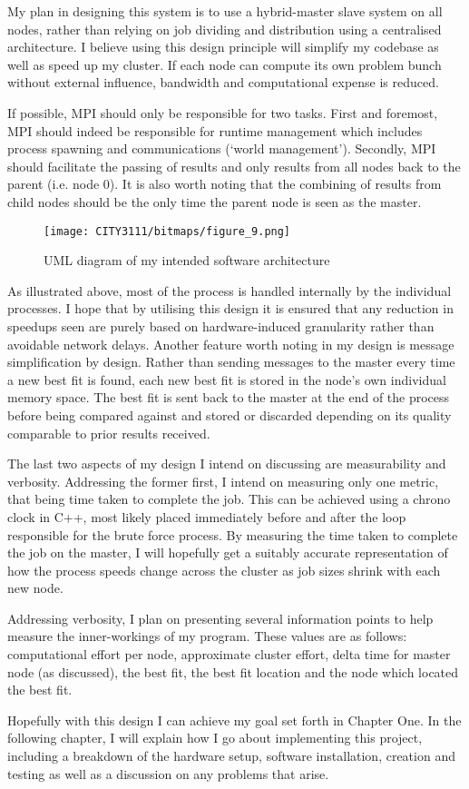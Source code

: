 My plan in designing this system is to use a hybrid-master slave system on all nodes, rather than relying on job dividing and distribution using a centralised architecture. I believe using this design principle will simplify my codebase as well as speed up my cluster. If each node can compute its own problem bunch without external influence, bandwidth and computational expense is reduced.

If possible, MPI should only be responsible for two tasks. First and foremost, MPI should indeed be responsible for runtime management which includes process spawning and communications (`world management'). Secondly, MPI should facilitate the passing of results and only results from all nodes back to the parent (i.e. node 0). It is also worth noting that the combining of results from child nodes should be the only time the parent node is seen as the master.

\begin{figure}[H]
    \centering
    \texttt{[image: CITY3111/bitmaps/figure\_9.png]}
    \caption{UML diagram of my intended software architecture}
    \label{figure_9}
\end{figure}

As illustrated above, most of the process is handled internally by the individual processes. I hope that by utilising this design it is ensured that any reduction in speedups seen are purely based on hardware-induced granularity rather than avoidable network delays. Another feature worth noting in my design is message simplification by design. Rather than sending messages to the master every time a new best fit is found, each new best fit is stored in the node's own individual memory space. The best fit is sent back to the master at the end of the process before being compared against and stored or discarded depending on its quality comparable to prior results received.

The last two aspects of my design I intend on discussing are measurability and verbosity. Addressing the former first, I intend on measuring only one metric, that being time taken to complete the job. This can be achieved using a chrono clock in C++, most likely placed immediately before and after the loop responsible for the brute force process. By measuring the time taken to complete the job on the master, I will hopefully get a suitably accurate representation of how the process speeds change across the cluster as job sizes shrink with each new node.

Addressing verbosity, I plan on presenting several information points to help measure the inner-workings of my program. These values are as follows: computational effort per node, approximate cluster effort, delta time for master node (as discussed), the best fit, the best fit location and the node which located the best fit.

Hopefully with this design I can achieve my goal set forth in Chapter One. In the following chapter, I will explain how I go about implementing this project, including a breakdown of the hardware setup, software installation, creation and testing as well as a discussion on any problems that arise.
